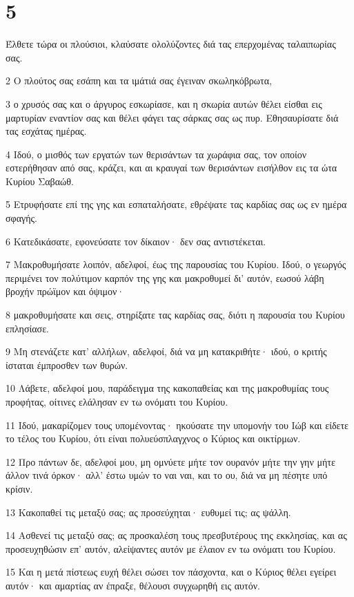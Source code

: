 \chapter{5}

\par Έλθετε τώρα οι πλούσιοι, κλαύσατε ολολύζοντες διά τας επερχομένας ταλαιπωρίας σας.
\par 2 Ο πλούτος σας εσάπη και τα ιμάτιά σας έγειναν σκωληκόβρωτα,
\par 3 ο χρυσός σας και ο άργυρος εσκωρίασε, και η σκωρία αυτών θέλει είσθαι εις μαρτυρίαν εναντίον σας και θέλει φάγει τας σάρκας σας ως πυρ. Εθησαυρίσατε διά τας εσχάτας ημέρας.
\par 4 Ιδού, ο μισθός των εργατών των θερισάντων τα χωράφια σας, τον οποίον εστερήθησαν από σας, κράζει, και αι κραυγαί των θερισάντων εισήλθον εις τα ώτα Κυρίου Σαβαώθ.
\par 5 Ετρυφήσατε επί της γης και εσπαταλήσατε, εθρέψατε τας καρδίας σας ως εν ημέρα σφαγής.
\par 6 Κατεδικάσατε, εφονεύσατε τον δίκαιον· δεν σας αντιστέκεται.
\par 7 Μακροθυμήσατε λοιπόν, αδελφοί, έως της παρουσίας του Κυρίου. Ιδού, ο γεωργός περιμένει τον πολύτιμον καρπόν της γης και μακροθυμεί δι' αυτόν, εωσού λάβη βροχήν πρώϊμον και όψιμον·
\par 8 μακροθυμήσατε και σεις, στηρίξατε τας καρδίας σας, διότι η παρουσία του Κυρίου επλησίασε.
\par 9 Μη στενάζετε κατ' αλλήλων, αδελφοί, διά να μη κατακριθήτε· ιδού, ο κριτής ίσταται έμπροσθεν των θυρών.
\par 10 Λάβετε, αδελφοί μου, παράδειγμα της κακοπαθείας και της μακροθυμίας τους προφήτας, οίτινες ελάλησαν εν τω ονόματι του Κυρίου.
\par 11 Ιδού, μακαρίζομεν τους υπομένοντας· ηκούσατε την υπομονήν του Ιώβ και είδετε το τέλος του Κυρίου, ότι είναι πολυεύσπλαγχνος ο Κύριος και οικτίρμων.
\par 12 Προ πάντων δε, αδελφοί μου, μη ομνύετε μήτε τον ουρανόν μήτε την γην μήτε άλλον τινά όρκον· αλλ' έστω υμών το ναι ναι, και το ου, διά να μη πέσητε υπό κρίσιν.
\par 13 Κακοπαθεί τις μεταξύ σας; ας προσεύχηται· ευθυμεί τις; ας ψάλλη.
\par 14 Ασθενεί τις μεταξύ σας; ας προσκαλέση τους πρεσβυτέρους της εκκλησίας, και ας προσευχηθώσιν επ' αυτόν, αλείψαντες αυτόν με έλαιον εν τω ονόματι του Κυρίου.
\par 15 Και η μετά πίστεως ευχή θέλει σώσει τον πάσχοντα, και ο Κύριος θέλει εγείρει αυτόν· και αμαρτίας αν έπραξε, θέλουσι συγχωρηθή εις αυτόν.
